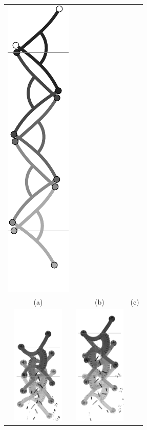 \documentclass[letterpaper,10pt,conference]{ieeeconf}  %
\begin{document}
\begin{figure}
\begin{center}
\begin{tabular}{ccc}
\includegraphics[scale=1]{../Pics/py/straight_f_ori_0001.pdf} \\
(a) & (b) & (c) \\
%
\includegraphics[width=2.45cm]{../Pics/experiment/straight_a.png}&
\includegraphics[width=2.45cm]{../Pics/experiment/straight_b.png}&

\end{tabular}
\end{center}
\end{figure}
\end{document}

